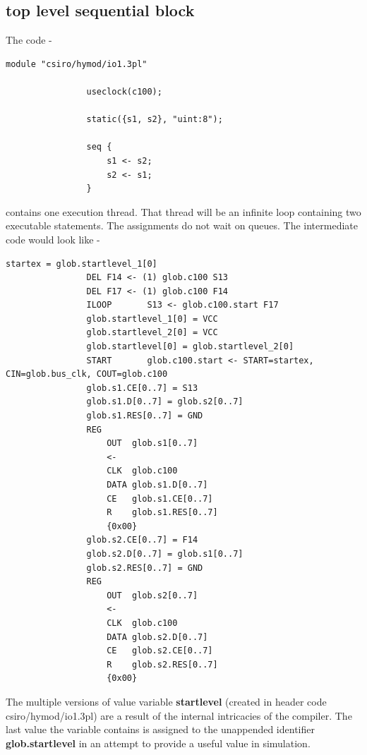 \documentclass[10pt,a4paper,twoside,fleqn]{book}
\begin{document}
        \subsection{top level sequential block}

            The code -
            \begin{lstlisting}[gobble=12, language=threepl]
                module "csiro/hymod/io1.3pl"

                useclock(c100);

                static({s1, s2}, "uint:8");

                seq {
                    s1 <- s2;
                    s2 <- s1;
                }
            \end{lstlisting}
            contains one execution thread. That thread will be an infinite loop
            containing two executable statements. The assignments do not wait on
            queues. The intermediate code would look like -
            \begin{lstlisting}[gobble=12, language=tde]
                startex = glob.startlevel_1[0]
                DEL F14 <- (1) glob.c100 S13
                DEL F17 <- (1) glob.c100 F14
                ILOOP       S13 <- glob.c100.start F17
                glob.startlevel_1[0] = VCC
                glob.startlevel_2[0] = VCC
                glob.startlevel[0] = glob.startlevel_2[0]
                START       glob.c100.start <- START=startex, CIN=glob.bus_clk, COUT=glob.c100
                glob.s1.CE[0..7] = S13
                glob.s1.D[0..7] = glob.s2[0..7]
                glob.s1.RES[0..7] = GND
                REG
                    OUT  glob.s1[0..7]
                    <-
                    CLK  glob.c100
                    DATA glob.s1.D[0..7]
                    CE   glob.s1.CE[0..7]
                    R    glob.s1.RES[0..7]
                    {0x00}
                glob.s2.CE[0..7] = F14
                glob.s2.D[0..7] = glob.s1[0..7]
                glob.s2.RES[0..7] = GND
                REG
                    OUT  glob.s2[0..7]
                    <-
                    CLK  glob.c100
                    DATA glob.s2.D[0..7]
                    CE   glob.s2.CE[0..7]
                    R    glob.s2.RES[0..7]
                    {0x00}
            \end{lstlisting}
            The multiple versions of value variable {\bf startlevel} (created
            in header code csiro/hymod/io1.3pl) are a result of the internal
            intricacies of the compiler. The last value the variable contains
            is assigned to the unappended identifier {\bf glob.startlevel}
            in an attempt to provide a useful value in simulation.
\end{document}
